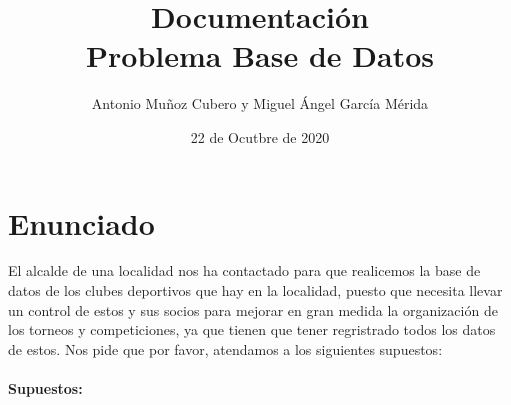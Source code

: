 \documentclass{article}
\title{Documentación \\\large \textbf{Problema Base de Datos}}
\author{Antonio Muñoz Cubero y Miguel Ángel García Mérida}
\date{22 de Ocutbre de 2020}
\begin{document}
  \maketitle
  \newpage
    \section{Enunciado}
      El alcalde de una localidad nos ha contactado para que realicemos la base de datos de los clubes deportivos que hay en la localidad, puesto que necesita llevar un 
      control de estos y sus socios para mejorar en gran medida la organización de los torneos y competiciones, ya que tienen que tener regristrado todos los datos de estos. 
      Nos pide que por favor, atendamos a los siguientes supuestos:
    \\
    \\
    \textbf{Supuestos:}
    \\
\end{document}
